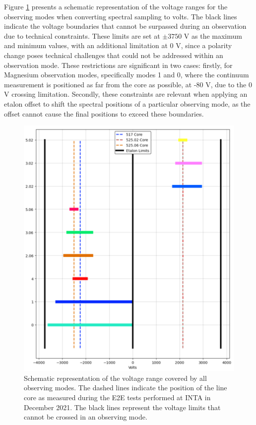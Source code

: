Figure \ref{fig_pipeline: Observing modes ranges} presents a schematic representation of the voltage ranges for the observing modes when converting spectral sampling to volts. The black lines indicate the voltage boundaries that cannot be surpassed during an observation due to technical constraints. These limits are set at $\pm 3750$ V as the maximum and minimum values, with an additional limitation at 0 V, since a polarity change poses technical challenges that could not be addressed within an observation mode. These restrictions are significant in two cases: firstly, for Magnesium observation modes, specifically modes 1 and 0, where the continuum measurement is positioned as far from the core as possible, at -80 V, due to the 0 V crossing limitation. Secondly, these constraints are relevant when applying an etalon offset to shift the spectral positions of a particular observing mode, as the offset cannot cause the final positions to exceed these boundaries.

\begin{figure}[t]
    \begin{minipage}[c]{0.67\textwidth}
      \includegraphics[width=\textwidth]{figures/Pipeline/obs_modes.pdf}
    \end{minipage}\hfill
    \begin{minipage}[c]{0.29\textwidth}
      \caption{
       Schematic representation of the voltage range covered by all observing modes. The dashed lines indicate the position of the line core as measured during the E2E tests performed at INTA in December 2021. The black lines represent the voltage limits that cannot be crossed in an observing mode.
       \label{fig_pipeline: Observing modes ranges}
      } 
    \end{minipage}
  \end{figure}


